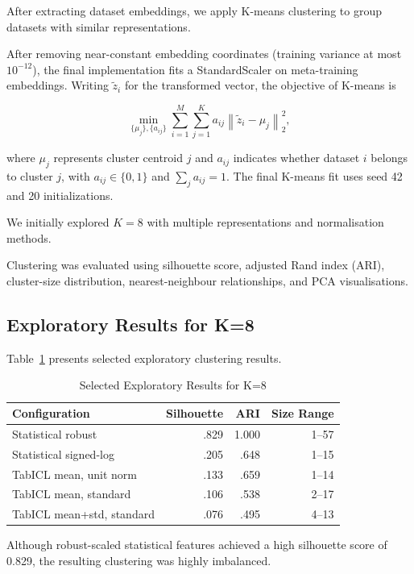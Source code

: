 \documentclass[conference]{IEEEtran}
\begin{document}
After extracting dataset embeddings, we apply K-means clustering to group datasets with similar representations.

After removing near-constant embedding coordinates (training variance at most $10^{-12}$), the final implementation fits a StandardScaler on meta-training embeddings. Writing $\widetilde z_i$ for the transformed vector, the objective of K-means is

\begin{equation}
\min_{\{\mu_j\},\{a_{ij}\}}
\sum_{i=1}^{M}
\sum_{j=1}^{K}
a_{ij}
\left\|\widetilde z_i-\mu_j\right\|_2^2,
\end{equation}

where $\mu_j$ represents cluster centroid $j$ and $a_{ij}$ indicates whether dataset $i$ belongs to cluster $j$, with $a_{ij}\in\{0,1\}$ and $\sum_j a_{ij}=1$. The final K-means fit uses seed 42 and 20 initializations.

We initially explored $K=8$ with multiple representations and normalisation methods.

Clustering was evaluated using silhouette score, adjusted Rand index (ARI), cluster-size distribution, nearest-neighbour relationships, and PCA visualisations.

\subsection{Exploratory Results for K=8}

Table~\ref{tab:k8} presents selected exploratory clustering results.

\begin{table}[t]
\caption{Selected Exploratory Results for K=8}
\label{tab:k8}
\centering
\footnotesize
\begin{tabular}{lrrr}
\toprule
Configuration & Silhouette & ARI & Size Range\\
\midrule
Statistical robust & .829 & 1.000 & 1--57\\
Statistical signed-log & .205 & .648 & 1--15\\
TabICL mean, unit norm & .133 & .659 & 1--14\\
TabICL mean, standard & .106 & .538 & 2--17\\
TabICL mean+std, standard & .076 & .495 & 4--13\\
\bottomrule
\end{tabular}
\end{table}

Although robust-scaled statistical features achieved a high silhouette score of 0.829, the resulting clustering was highly imbalanced.
\end{document}
